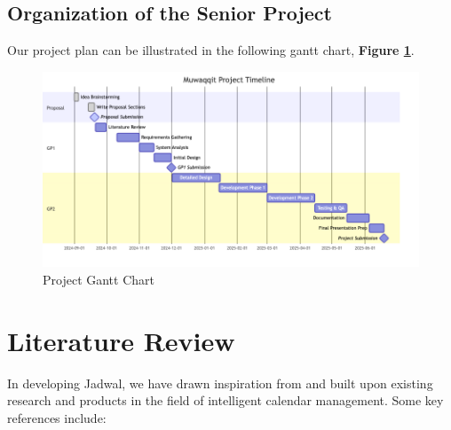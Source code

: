 \documentclass[12pt,a4paper]{report}
\begin{document}
\section{Organization of the Senior Project}

Our project plan can be illustrated in the following gantt chart, \textbf{Figure \ref{fig:project-gantt-chart}}.

\begin{figure}[!h]
    \centering
    \includegraphics[width=\textwidth]{images/gantt.png}
    \caption{Project Gantt Chart}
    \label{fig:project-gantt-chart}
\end{figure}

\chapter{Literature Review}

In developing Jadwal, we have drawn inspiration from and built upon existing research and products in the field of intelligent calendar management. Some key references include:
\end{document}
